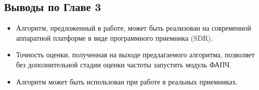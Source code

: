 \subsection{Выводы по Главе 3}

\begin{itemize}
\item Алгоритм, предложенный в работе, может быть реализован на современной аппаратной платформе в виде программного приемника (SDR). 
\item Точность оценки, полученная на выходе предлагаемого алгоритма, позволяет без дополнительной стадии оценки частоты запустить модуль ФАПЧ.
\item Алгоритм может быть использован при работе в реальных приемниках.
\end{itemize}

\clearpage
